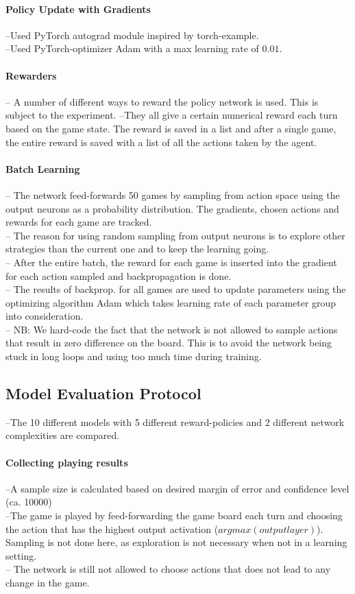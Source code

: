 \documentclass[12pt, fleqn]{article}
\begin{document}
\paragraph*{Policy Update with Gradients}
--Used PyTorch autograd module inspired by torch-example.\\
--Used PyTorch-optimizer Adam with a max learning rate of $0.01$.
\paragraph*{Rewarders}
-- A number of different ways to reward the policy network is used. This is subject to the experiment.
--They all give a certain numerical reward each turn based on the game state. The reward is saved in a list and after a single game, the entire reward is saved with a list of all the actions taken by the agent.
\paragraph*{Batch Learning}
-- The network feed-forwards 50 games by sampling from action space using the output neurons as a probability distribution. The gradients, chosen actions and rewards for each game are tracked.\\
-- The reason for using random sampling from output neurons is to explore other strategies than the current one and to keep the learning going.\\
-- After the entire batch, the reward for each game is inserted into the gradient for each action sampled and backpropagation is done.\\ 
-- The results of backprop. for all games are used to update parameters using the optimizing algorithm Adam which takes learning rate of each parameter group into consideration.\\
-- NB: We hard-code the fact that the network is not allowed to sample actions that result in zero difference on the board. This is to avoid the network being stuck in long loops and using too much time during training.
\subsection{Model Evaluation Protocol}
--The 10 different models with 5 different reward-policies and 2 different network complexities are compared.
\paragraph{Collecting playing results}
--A sample size is calculated based on desired margin of error and confidence level (ca. 10000)\\
--The game is played by feed-forwarding the game board each turn and choosing the action that has the highest output activation ($argmax(outputlayer)$). Sampling is not done here, as exploration is not necessary when not in a learning setting.\\ 
-- The network is still not allowed to choose actions that does not lead to any change in the game.
\end{document}
